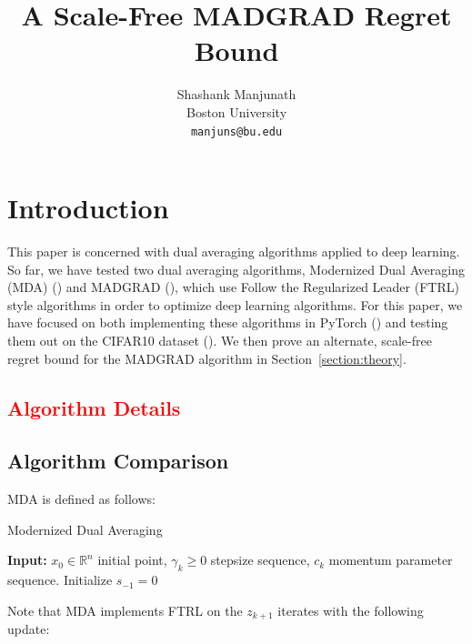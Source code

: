 \documentclass{article}
\title{A Scale-Free MADGRAD Regret Bound}
\author{
  Shashank Manjunath \\
  Boston University \\
  \texttt{manjuns@bu.edu} \\
}
\newcommand{\R}{\mathbb{R}}
\newcommand{\todo}[1]{\textcolor{red}{#1}}
\begin{document}
\maketitle

\section{Introduction}

This paper is concerned with dual averaging algorithms applied to deep learning. So far, we have tested two dual
averaging algorithms, Modernized Dual Averaging (MDA) (\cite{jelassi_dual_2020}) and MADGRAD
(\cite{defazio_adaptivity_nodate}), which use Follow the Regularized Leader (FTRL) style algorithms in order to optimize
deep learning algorithms. For this paper, we have focused on both implementing these algorithms in PyTorch
(\cite{paszke_pytorch_2019}) and testing them out on the CIFAR10 dataset (\cite{krizhevsky_learning_nodate}). We then
prove an alternate, scale-free regret bound for the MADGRAD algorithm in Section~\ref{section:theory}.

\todo{\section{Algorithm Details}}

\subsection{Algorithm Comparison}
MDA is defined as follows:

\begin{algorithm}
  \caption{Modernized Dual Averaging}\label{algo:mda}
  \textbf{Input:} $x_0 \in \R^n$ initial point, $\gamma_k \geq 0$ stepsize sequence, $c_k$ momentum parameter
  sequence. Initialize $s_{-1} = 0$ \\
\end{algorithm}

Note that MDA implements FTRL on the $z_{k+1}$ iterates with the following update:
\end{document}
